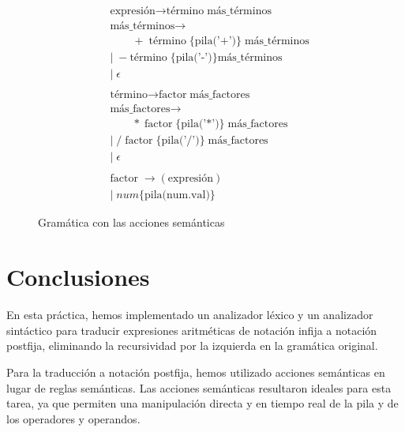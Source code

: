\documentclass[a4paper,twocolumn]{article}
\begin{document}
    \begin{figure}[h]
        \begin{align}
            &\text{expresión} \rightarrow \text{término} \; \text{más\_términos} \\
            &\text{más\_términos} \rightarrow   \\
            &\qquad+ \;\text{término} \; \{\text{pila('+')}\} \; \text{más\_términos} \nonumber  \\
            &\vert \; - \text{término} \; \{\text{pila('-')}\} \text{más\_términos} \\
            &\vert \; \epsilon \\
            \nonumber\\
            &\text{término} \rightarrow \text{factor} \; \text{más\_factores} \\
            &\text{más\_factores} \rightarrow \\
            &\qquad * \;\text{factor} \;\{\text{pila('*')}\}\; \text{más\_factores} \nonumber \\
            &\vert \; / \; \text{factor} \; \{\text{pila('/')}\} \; \text{más\_factores} \\
            &\vert \; \epsilon \\
            \nonumber\\
            &\text{factor} \; \rightarrow (\text{expresión})\\
            &\vert \; num  \{\text{pila(num.val)}\}
        \end{align}
        \caption{Gramática con las acciones semánticas}
        \label{fig:GramaticaConAcciones}
    \end{figure}


    \clearpage


    \section{Conclusiones}\label{sec:conclusiones}
    En esta práctica, hemos implementado un analizador léxico y un analizador sintáctico para traducir expresiones aritméticas de notación infija a notación postfija, eliminando la recursividad por la izquierda en la gramática original.

    Para la traducción a notación postfija, hemos utilizado acciones semánticas en lugar de reglas semánticas.
    Las acciones semánticas resultaron ideales para esta tarea, ya que permiten una manipulación directa y en tiempo real de la pila y de los operadores y operandos.
\end{document}
